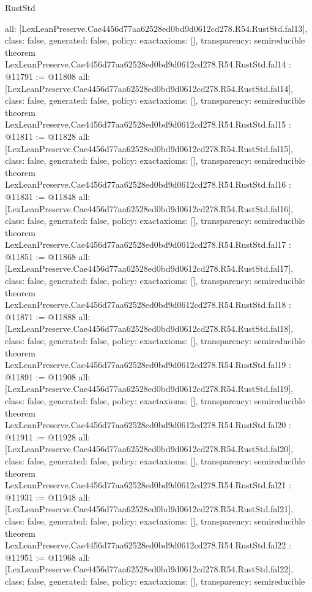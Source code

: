 \begin{lexlean}{RustStd}
\begin{coremodule}
{  all: [LexLeanPreserve.Cae4456d77aa62528ed0bd9d0612cd278.R54.RustStd.fal13],
  class: false,
  generated: false,
  policy: exact{axioms: []},
  transparency: semireducible
}
theorem LexLeanPreserve.Cae4456d77aa62528ed0bd9d0612cd278.R54.RustStd.fal14 : @11791 := @11808 {
  all: [LexLeanPreserve.Cae4456d77aa62528ed0bd9d0612cd278.R54.RustStd.fal14],
  class: false,
  generated: false,
  policy: exact{axioms: []},
  transparency: semireducible
}
theorem LexLeanPreserve.Cae4456d77aa62528ed0bd9d0612cd278.R54.RustStd.fal15 : @11811 := @11828 {
  all: [LexLeanPreserve.Cae4456d77aa62528ed0bd9d0612cd278.R54.RustStd.fal15],
  class: false,
  generated: false,
  policy: exact{axioms: []},
  transparency: semireducible
}
theorem LexLeanPreserve.Cae4456d77aa62528ed0bd9d0612cd278.R54.RustStd.fal16 : @11831 := @11848 {
  all: [LexLeanPreserve.Cae4456d77aa62528ed0bd9d0612cd278.R54.RustStd.fal16],
  class: false,
  generated: false,
  policy: exact{axioms: []},
  transparency: semireducible
}
theorem LexLeanPreserve.Cae4456d77aa62528ed0bd9d0612cd278.R54.RustStd.fal17 : @11851 := @11868 {
  all: [LexLeanPreserve.Cae4456d77aa62528ed0bd9d0612cd278.R54.RustStd.fal17],
  class: false,
  generated: false,
  policy: exact{axioms: []},
  transparency: semireducible
}
theorem LexLeanPreserve.Cae4456d77aa62528ed0bd9d0612cd278.R54.RustStd.fal18 : @11871 := @11888 {
  all: [LexLeanPreserve.Cae4456d77aa62528ed0bd9d0612cd278.R54.RustStd.fal18],
  class: false,
  generated: false,
  policy: exact{axioms: []},
  transparency: semireducible
}
theorem LexLeanPreserve.Cae4456d77aa62528ed0bd9d0612cd278.R54.RustStd.fal19 : @11891 := @11908 {
  all: [LexLeanPreserve.Cae4456d77aa62528ed0bd9d0612cd278.R54.RustStd.fal19],
  class: false,
  generated: false,
  policy: exact{axioms: []},
  transparency: semireducible
}
theorem LexLeanPreserve.Cae4456d77aa62528ed0bd9d0612cd278.R54.RustStd.fal20 : @11911 := @11928 {
  all: [LexLeanPreserve.Cae4456d77aa62528ed0bd9d0612cd278.R54.RustStd.fal20],
  class: false,
  generated: false,
  policy: exact{axioms: []},
  transparency: semireducible
}
theorem LexLeanPreserve.Cae4456d77aa62528ed0bd9d0612cd278.R54.RustStd.fal21 : @11931 := @11948 {
  all: [LexLeanPreserve.Cae4456d77aa62528ed0bd9d0612cd278.R54.RustStd.fal21],
  class: false,
  generated: false,
  policy: exact{axioms: []},
  transparency: semireducible
}
theorem LexLeanPreserve.Cae4456d77aa62528ed0bd9d0612cd278.R54.RustStd.fal22 : @11951 := @11968 {
  all: [LexLeanPreserve.Cae4456d77aa62528ed0bd9d0612cd278.R54.RustStd.fal22],
  class: false,
  generated: false,
  policy: exact{axioms: []},
  transparency: semireducible
}
\end{coremodule}
\end{lexlean}
